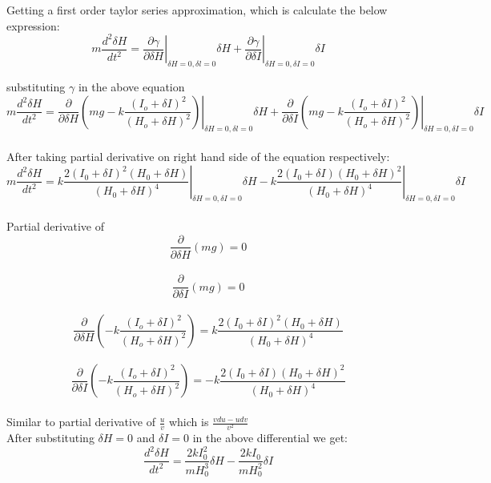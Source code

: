\documentclass[20pt]{article}
\begin{document}
\noindent Getting a first order taylor series approximation, which is calculate the below expression:
$$ m \frac{d^{2} \delta H}{d t^{2}}=\left.\frac{\partial \gamma}{\partial \delta H}\right|_{\delta H=0, \delta l=0} \delta H+\left.\frac{\partial \gamma}{\partial \delta I}\right|_{\delta H=0, \delta I=0} \delta I $$

\noindent substituting $\gamma$ in the above equation \\

$$ m\frac{d^2 \delta H}{dt^2} = \left.\frac{\partial}{\partial \delta H}(mg - k\frac{(I_o + \delta I)^2}{(H_o + \delta H)^2})\right|_{\delta H=0, \delta l=0} \delta H+\left.\frac{\partial }{\partial \delta I}(mg - k\frac{(I_o + \delta I)^2}{(H_o + \delta H)^2})\right|_{\delta H=0, \delta I=0} \delta I  $$\\
After taking partial derivative on right hand side of the equation respectively:\\

$$ m \frac{d^2 \delta H}{d t^2}=\left.k \frac{2\left(I_{0}+\delta I\right)^2\left(H_{0}+\delta H\right)}{\left(H_{0}+\delta H\right)^4}\right|_{\delta H=0, \delta I=0} \delta H-\left.k \frac{2\left(I_{0}+\delta I\right)\left(H_{0}+\delta H\right)^2}{\left(H_{0}+\delta H\right)^4}\right|_{\delta H=0, \delta I=0} \delta I$$\\

\noindent Partial derivative of 
$$ \frac{\partial}{\partial \delta H}(mg) = 0$$ \\
$$ \frac{\partial}{\partial \delta I}(mg) = 0$$ \\

$$\frac{\partial}{\partial \delta H} (- k\frac{(I_o + \delta I)^2}{(H_o + \delta H)^2}) = k\frac{2\left(I_{0}+\delta I\right)^2\left(H_{0}+\delta H\right)}{\left(H_{0}+\delta H\right)^4}$$ \\

$$\frac{\partial}{\partial \delta I} (- k\frac{(I_o + \delta I)^2}{(H_o + \delta H)^2})  = -k \frac{2\left(I_{0}+\delta I\right)\left(H_{0}+\delta H\right)^2}{\left(H_{0}+\delta H\right)^4}  $$ \\

\noindent Similar to partial derivative of $ \frac{u}{v}$ which is $ \frac{vdu - udv}{v^2}$ \\

\noindent After substituting $ \delta H = 0 $ and $ \delta I = 0 $ in the above differential we get:\\

$$  \frac{d^{2} \delta H}{d t^{2}}=\frac{2 k I_{0}^{2}}{m H_{0}^{3}} \delta H-\frac{2 k I_{0}}{m H_{0}^{2}} \delta I  $$\\
\end{document}
